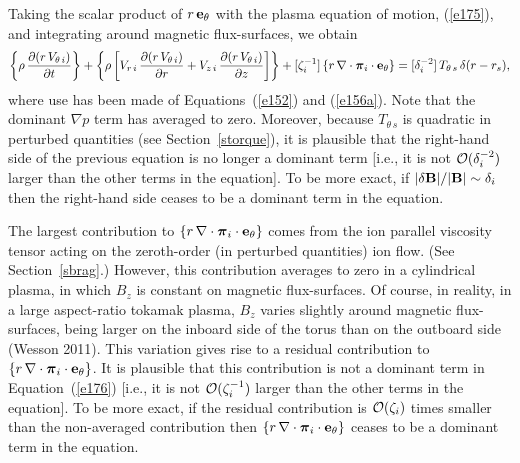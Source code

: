\documentclass[notitlepage,12pt]{article}
\newcommand{\bpi}{\mbox{\boldmath$\pi$}}
\begin{document}
Taking  the scalar product of $r\,{\bf e}_\theta$ with the plasma equation of motion, (\ref{e175}), and integrating around magnetic
flux-surfaces, we obtain 
\begin{equation}\label{e176}
\left\{\rho\,\frac{\partial (r\,V_{\theta\,i})}{\partial t} \right\} 
+\left\{ \rho\left[V_{r\,i}\,\frac{\partial (r\,V_{\theta\,i})}{\partial r} + V_{z\,i}\,\frac{\partial(r\, V_{\theta\,i})}{\partial z}
\right]\right\} + [\zeta_i^{-1}]\,\{ r\,\nabla\cdot \bpi_i\cdot{\bf e}_\theta\}
= [\delta_i^{-2}]\,T_{\theta\,s}\,\delta(r-r_s),
\end{equation}
where use has been made of Equations~(\ref{e152}) and (\ref{e156a}). Note that the dominant $\nabla p$ term
has averaged to zero. Moreover, because $T_{\theta\,s}$ is quadratic in perturbed quantities (see Section~\ref{storque}), it is plausible that the right-hand side of the previous equation is no longer a dominant term [i.e., it is not ${\cal O}(\delta_i^{-2})$ larger than the
other terms in the equation]. To be more exact, if $|\delta {\bf B}|/|{\bf B}|\sim \delta_i$ then the right-hand side ceases to be a dominant term in the equation. 

The largest contribution to $\{ r\,\nabla\cdot \bpi_i\cdot{\bf e}_\theta\}$
comes from the ion parallel viscosity tensor acting on the zeroth-order (in perturbed quantities) ion flow. (See Section~\ref{sbrag}.)  However, this contribution averages to zero in a cylindrical plasma, in which $B_z$
is constant on magnetic flux-surfaces. Of course, in reality, in a large aspect-ratio tokamak plasma, 
$B_z$ varies slightly around magnetic flux-surfaces, being larger on the inboard side of the torus than on the outboard side (Wesson 2011). This variation gives rise to a residual contribution to $\{r\,\nabla\cdot \bpi_i\cdot{\bf e}_\theta\}$.
It is plausible that this contribution is not a dominant term in Equation~(\ref{e176})  [i.e., it is not ${\cal O}(\zeta_i^{-1})$ larger than the
other terms in the equation]. To be more exact, if the residual contribution is ${\cal O}(\zeta_i)$ times smaller than the non-averaged  contribution then  $\{ r\,\nabla\cdot \bpi_i\cdot{\bf e}_\theta\}$ ceases to be a dominant term in the equation.
\end{document}
